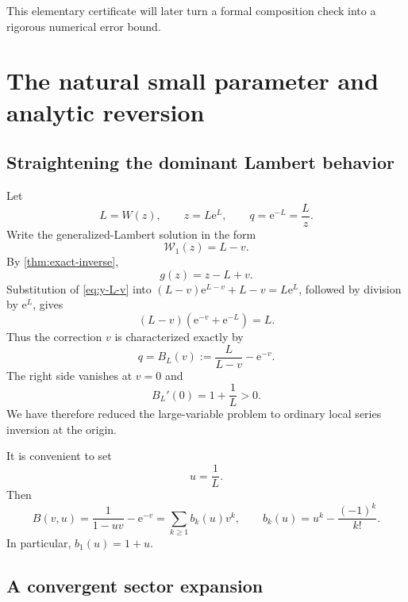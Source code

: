 \documentclass[11pt,a4paper]{article}
\numberwithin{equation}{section}
\theoremstyle{definition}
\theoremstyle{remark}
\newcommand{\e}{\mathrm e}
\newcommand{\rW}{\mathcal W}
\begin{document}
This elementary certificate will later turn a formal composition check into
a rigorous numerical error bound.

\section{The natural small parameter and analytic reversion}

\subsection{Straightening the dominant Lambert behavior}

Let
\begin{equation}\label{eq:Lq-def}
  L=W(z),\qquad z=L\e^L,
  \qquad q=\e^{-L}=\frac{L}{z}.
\end{equation}
Write the generalized-Lambert solution in the form
\begin{equation}\label{eq:y-L-v}
  \rW_1(z)=L-v.
\end{equation}
By \cref{thm:exact-inverse},
\begin{equation}\label{eq:g-z-L-v}
  g(z)=z-L+v.
\end{equation}
Substitution of \eqref{eq:y-L-v} into
\((L-v)\e^{L-v}+L-v=L\e^L\), followed by division by \(\e^L\), gives
\[
  (L-v)(\e^{-v}+\e^{-L})=L.
\]
Thus the correction \(v\) is characterized exactly by
\begin{equation}\label{eq:B-L-equation}
  q=B_L(v):=\frac{L}{L-v}-\e^{-v}.
\end{equation}
The right side vanishes at \(v=0\) and
\[
  B_L'(0)=1+\frac1L>0.
\]
We have therefore reduced the large-variable problem to ordinary local
series inversion at the origin.

It is convenient to set
\begin{equation}\label{eq:u-def}
  u=\frac1L.
\end{equation}
Then
\begin{equation}\label{eq:Bvu}
  B(v,u)=\frac1{1-uv}-\e^{-v}
        =\sum_{k\ge1}b_k(u)v^k,
  \qquad
  b_k(u)=u^k-\frac{(-1)^k}{k!}.
\end{equation}
In particular, \(b_1(u)=1+u\).

\subsection{A convergent sector expansion}
\end{document}
